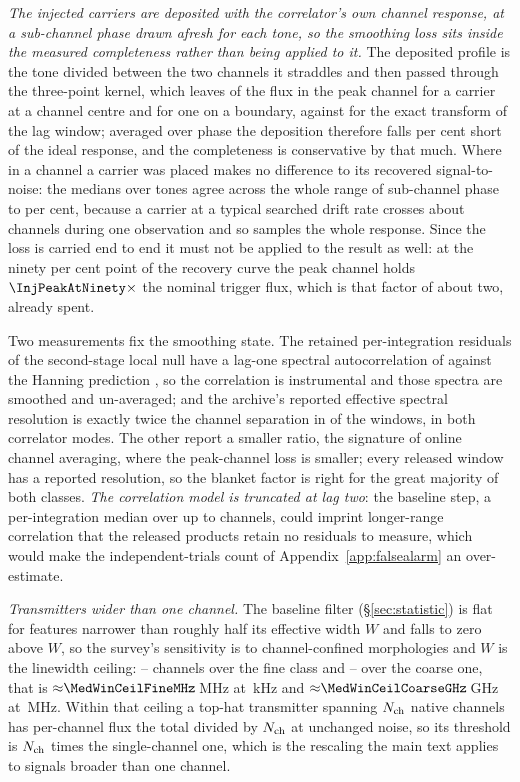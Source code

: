 \emph{The injected carriers are deposited with the correlator's own channel
response, at a sub-channel phase drawn afresh for each tone, so the smoothing
loss sits inside the measured completeness rather than being applied to it.}
The deposited profile is the tone divided between the two channels it
straddles and then passed through the three-point kernel, which leaves
\InjDepCentre{} of the flux in the peak channel for a carrier at a channel
centre and \InjDepEdge{} for one on a boundary, against \InjRespEdge{} for
the exact transform of the lag window; averaged over phase the deposition
therefore falls \InjShortPct{} per cent short of the ideal response, and the
completeness is conservative by that much. Where in a channel a carrier was
placed makes no difference to its recovered signal-to-noise: the medians over
\InjNPhaseTone{} tones agree across the whole range of sub-channel phase to
\InjPhaseFlatPct{} per cent, because a carrier at a typical searched drift
rate crosses about \InjDriftChan{} channels during one observation and so
samples the whole response. Since the loss is carried end to end it must not
be applied to the result as well: at the ninety per cent point of the
recovery curve the peak channel holds $\InjPeakAtNinety\times$ the nominal
trigger flux, which is that factor of about two, already spent.

Two measurements fix the smoothing state. The retained per-integration
residuals of the second-stage local null have a lag-one spectral
autocorrelation of \LNLagOne{} against the Hanning prediction \HanRhoOne, so
the correlation is instrumental and those spectra are smoothed and
un-averaged; and the archive's reported effective spectral resolution is
exactly twice the channel separation in \NHanTwo{} of the \NHanKnown{}
windows, in both correlator modes. The other \NHanOther{} report a smaller
ratio, the signature of online channel averaging, where the peak-channel loss
is smaller; every released window has a reported resolution, so the blanket
factor is right for the great majority of both classes. \emph{The correlation model is truncated at
lag two}: the baseline step, a per-integration median over up to \MedWin{}
channels, could imprint longer-range correlation that the released products
retain no residuals to measure, which would make the independent-trials count
of Appendix~\ref{app:falsealarm} an over-estimate.

\emph{Transmitters wider than one channel.} The baseline filter
(\S\ref{sec:statistic}) is flat for features narrower than roughly half its
effective width $W$ and falls to zero above $W$, so the survey's sensitivity
is to channel-confined morphologies and $W$ is the linewidth ceiling:
\MedWinFineLo--\MedWinFineHi{} channels over the fine class and
\MedWinCoarseLo--\MedWinCoarseHi{} over the coarse one, that is
${\approx}\MedWinCeilFineMHz$\,MHz at \ChanFineKHz\,kHz and
${\approx}\MedWinCeilCoarseGHz$\,GHz at \ChanCoarseMHz\,MHz. Within that
ceiling a top-hat transmitter spanning $N_{\rm ch}$ native channels has
per-channel flux the total divided by $N_{\rm ch}$ at unchanged noise, so
its threshold is $N_{\rm ch}$ times the single-channel one, which is the
rescaling the main text applies to signals broader than one channel.

